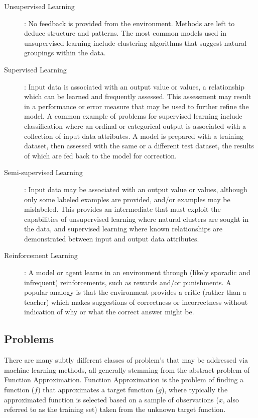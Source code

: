 \documentclass[a4paper, 11pt]{article}
\begin{document}
\begin{description}
	\item[Unsupervised Learning]: No feedback is provided from the environment. Methods are left to deduce structure and patterns. The most common models used in unsupervised learning include clustering algorithms that suggest natural groupings within the data.
	
	\item[Supervised Learning]: Input data is associated with an output value or values, a relationship which can be learned and frequently assessed. This assessment may result in a performance or error measure that may be used to further refine the model. A common example of problems for supervised learning include classification where an ordinal or categorical output is associated with a collection of input data attributes. A model is prepared with a training dataset, then assessed with the same or a different test dataset, the results of which are fed back to the model for correction.
	
	\item[Semi-supervised Learning]: Input data may be associated with an output value or values, although only some labeled examples are provided, and/or examples may be mislabeled. This provides an intermediate that must exploit the capabilities of unsupervised learning where natural clusters are sought in the data, and supervised learning where known relationships are demonstrated between input and output data attributes. 
	
	\item[Reinforcement Learning]: A model or agent learns in an environment through (likely sporadic and infrequent) reinforcements, such as rewards and/or punishments. A popular analogy is that the environment provides a critic (rather than a teacher) which makes suggestions of correctness or incorrectness without indication of why or what the correct answer might be.
\end{description}


\subsection{Problems}
\label{subsec:problems}
There are many subtly different classes of problem's that may be addressed via machine learning methods, all generally stemming from the abstract problem of Function Approximation. Function Approximation is the problem of finding a function ($f$) that approximates a target function ($g$), where typically the approximated function is selected based on a sample of observations ($x$, also referred to as the training set) taken from the unknown target function.
\end{document}
